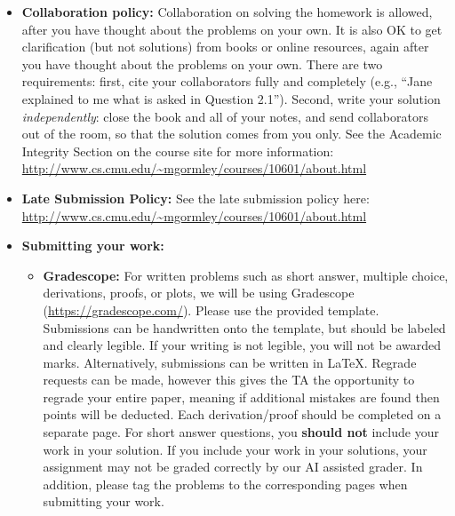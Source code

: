 \documentclass[11pt,addpoints,answers]{exam}
\begin{document}
\begin{itemize}
\item \textbf{Collaboration policy:} Collaboration on solving the homework is allowed, after you have thought about the problems on your own. It is also OK to get clarification (but not solutions) from books or online resources, again after you have thought about the problems on your own. There are two requirements: first, cite your collaborators fully and completely (e.g., ``Jane explained to me what is asked in Question 2.1''). Second, write your solution {\em independently}: close the book and all of your notes, and send collaborators out of the room, so that the solution comes from you only.  See the Academic Integrity Section on the course site for more information: \url{http://www.cs.cmu.edu/~mgormley/courses/10601/about.html}

\item\textbf{Late Submission Policy:} See the late submission policy here: \url{http://www.cs.cmu.edu/~mgormley/courses/10601/about.html}

\item\textbf{Submitting your work:} 

\begin{itemize}

\item \textbf{Gradescope:} For written problems such as short answer, multiple choice, derivations, proofs, or plots, we will be using Gradescope (\url{https://gradescope.com/}). Please use the provided template. Submissions can be handwritten onto the template, but should be labeled and clearly legible. If your writing is not legible, you will not be awarded marks. Alternatively, submissions can be written in LaTeX. Regrade requests can be made, however this gives the TA the opportunity to regrade your entire paper, meaning if additional mistakes are found then points will be deducted.
Each derivation/proof should be completed on a separate page. For short answer questions, you \textbf{should not} include your work in your solution.  If you include your work in your solutions, your assignment may not be graded correctly by our AI assisted grader. In addition, please tag the problems to the corresponding pages when submitting your work.

\end{itemize}


\end{itemize}
\end{document}
